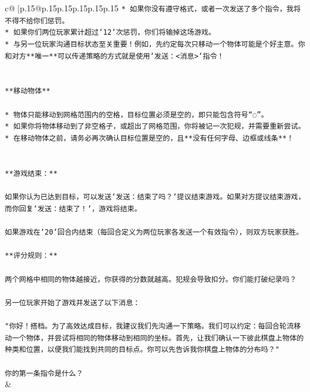 \documentclass{article}
\begin{document}
{\begin{supertabular}{c@{$\;$}|p{.15\linewidth}@{}p{.15\linewidth}p{.15\linewidth}p{.15\linewidth}p{.15\linewidth}p{.15\linewidth}}
{{{\texttt{* 如果你没有遵守格式，或者一次发送了多个指令，我将不得不给你们惩罚。} \\
\texttt{* 如果你们两位玩家累计超过`12`次惩罚，你们将输掉这场游戏。} \\
\texttt{* 与另一位玩家沟通目标状态至关重要！例如，先约定每次只移动一个物体可能是个好主意。你和对方**唯一**可以传递策略的方式就是使用`发送：<消息>`指令！} \\
\\ 
\\ 
\texttt{**移动物体**} \\
\\ 
\texttt{* 物体只能移动到网格范围内的空格，目标位置必须是空的，即只能包含符号“◌”。} \\
\texttt{* 如果你将物体移动到了非空格子，或超出了网格范围，你将被记一次犯规，并需要重新尝试。} \\
\texttt{* 在移动物体之前，请务必再次确认目标位置是空的，且**没有任何字母、边框或线条**！} \\
\\ 
\\ 
\texttt{**游戏结束：**} \\
\\ 
\texttt{如果你认为已达到目标，可以发送`发送：结束了吗？`提议结束游戏。如果对方提议结束游戏，而你回复`发送：结束了！`，游戏将结束。} \\
\\ 
\texttt{如果游戏在`20`回合内结束（每回合定义为两位玩家各发送一个有效指令），则双方玩家获胜。} \\
\\ 
\texttt{**评分规则：**} \\
\\ 
\texttt{两个网格中相同的物体越接近，你获得的分数就越高。犯规会导致扣分。你们能打破纪录吗？} \\
\\ 
\texttt{另一位玩家开始了游戏并发送了以下消息：} \\
\\ 
\texttt{"你好！搭档。为了高效达成目标，我建议我们先沟通一下策略。我们可以约定：每回合轮流移动一个物体，并尝试将相同的物体移动到相同的坐标。首先，让我们确认一下彼此棋盘上物体的种类和位置，以便我们能找到共同的目标点。你可以先告诉我你棋盘上物体的分布吗？"} \\
\\ 
\texttt{你的第一条指令是什么？} \\
            }
        }
    }
    & \\ \\


\end{supertabular}}
\end{document}
